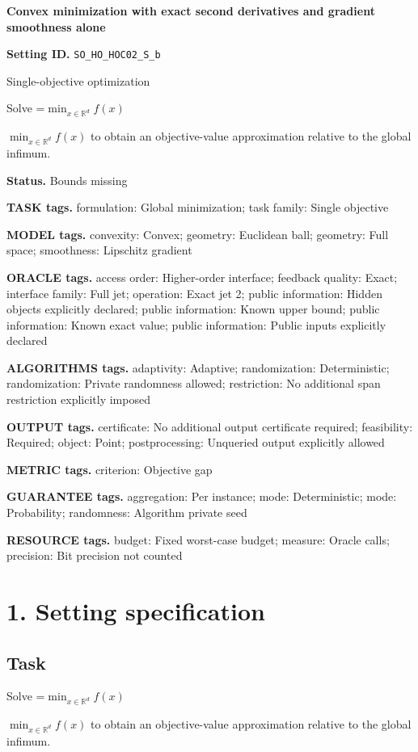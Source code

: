\documentclass[10pt,a4paper]{article}
\newcommand{\AtlasMath}[1]{\par\begingroup\centering\setbox0=\hbox{$\displaystyle #1$}\ifdim\wd0>1.4\linewidth\typeout{ATLAS WIDE FORMULA: \the\wd0}\fi\ifdim\wd0>\linewidth\resizebox{\linewidth}{!}{\box0}\else\box0\fi\par\endgroup}
\newcommand{\AtlasInlineMath}[1]{\begingroup\setbox0=\hbox{$#1$}\ifdim\wd0>.4\linewidth\endgroup\AtlasMath{#1}\else\endgroup$#1$\fi}
\begin{document}
\raggedright

{\LARGE\bfseries\sffamily\color{AtlasNavy} Convex minimization with exact second derivatives and gradient smoothness alone\par}\vspace{5pt}
\textbf{Setting ID.} \texttt{SO\_\allowbreak{}HO\_\allowbreak{}HOC02\_\allowbreak{}S\_\allowbreak{}b}

Single-objective optimization

Solve \AtlasInlineMath{\min_{x\in \mathbb{R}^d}f(x)} to obtain an objective-value approximation relative to the global infimum.

\textbf{Status.} Bounds missing

\textbf{TASK tags.} formulation: Global minimization; task family: Single objective

\textbf{MODEL tags.} convexity: Convex; geometry: Euclidean ball; geometry: Full space; smoothness: Lipschitz gradient

\textbf{ORACLE tags.} access order: Higher-order interface; feedback quality: Exact; interface family: Full jet; operation: Exact jet 2; public information: Hidden objects explicitly declared; public information: Known upper bound; public information: Known exact value; public information: Public inputs explicitly declared

\textbf{ALGORITHMS tags.} adaptivity: Adaptive; randomization: Deterministic; randomization: Private randomness allowed; restriction: No additional span restriction explicitly imposed

\textbf{OUTPUT tags.} certificate: No additional output certificate required; feasibility: Required; object: Point; postprocessing: Unqueried output explicitly allowed

\textbf{METRIC tags.} criterion: Objective gap

\textbf{GUARANTEE tags.} aggregation: Per instance; mode: Deterministic; mode: Probability; randomness: Algorithm private seed

\textbf{RESOURCE tags.} budget: Fixed worst-case budget; measure: Oracle calls; precision: Bit precision not counted

\section{1. Setting specification}
\subsection{Task}
Solve \AtlasInlineMath{\min_{x\in \mathbb{R}^d}f(x)} to obtain an objective-value approximation relative to the global infimum.
\end{document}
